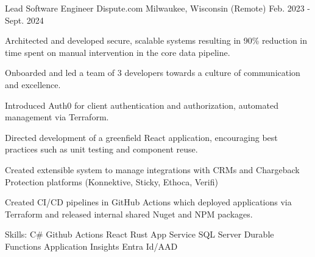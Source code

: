 

\begin{cventries}

  \cventry
    {Lead Software Engineer} %
    {Dispute.com} %
    {Milwaukee, Wisconsin (Remote)} %
    {Feb. 2023 - Sept. 2024} %
    {
      \begin{cvitems} %
        \item {Architected and developed secure, scalable systems resulting in 90\% reduction in time spent on 
                manual intervention in the core data pipeline.}
        \item {Onboarded and led a team of 3 developers towards a culture of communication and excellence.}
        \item {Introduced Auth0 for client authentication and authorization, automated management via Terraform.}
        \item {Directed development of a greenfield React application, encouraging best practices such as unit testing and component reuse.}
        \item {Created extensible system to manage integrations with CRMs and Chargeback Protection platforms (Konnektive, Sticky, Ethoca, Verifi)}
        \item {Created CI/CD pipelines in GitHub Actions which deployed applications via Terraform and released internal shared Nuget and NPM packages.}
        \item {Skills: C\# \textbullet{} Github Actions \textbullet{} React \textbullet{} Rust \textbullet{} App Service \textbullet{} SQL Server \textbullet{} Durable Functions \textbullet{} Application Insights \textbullet{} Entra Id/AAD}
      \end{cvitems}
    }


\end{cventries}
